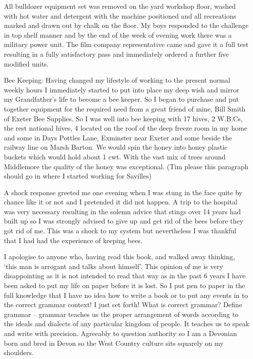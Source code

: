 All bulldozer equipment set was removed on the yard workshop floor, washed with
hot water and detergent with the machine positioned and all recreations marked
and drawn out by chalk on the floor.  My boys responded to the challenge in top
shelf manner and by the end of the week of evening work there was a military
power unit.  The film company representative came and gave it a full test
resulting in a fully satisfactory pass and immediately ordered a further five
modified units.

Bee Keeping:  Having changed my lifestyle of working to the present normal
weekly hours I immediately started to put into place my deep wish and mirror my
Grandfather's life to become a bee keeper.  So I began to purchase and put
together equipment for the required need from a great friend of mine, Bill
Smith of Exeter Bee Supplies.  So I was well into bee keeping with 17 hives, 2
W.B.Cs, the rest national hives, 4 located on the roof of the deep freeze room
in my home and some in Days Pottles Lane, Exminster near Exeter and some beside
the railway line on Marsh Barton.  We would spin the honey into honey plastic
buckets which would hold about 1 cwt.  With the vast mix of trees around
Middlemore the quality of the honey was exceptional.  (Tim please this
paragraph should go in where I started working for Savilles)

A shock response greeted me one evening when I was stung in the face quite by
chance like it or not and I pretended it did not happen.  A trip to the
hospital was very necessary resulting in the solemn advice that stings over 14
years had built up so I was strongly advised to give up and get rid of the bees
before they got rid of me.  This was a shock to my system but nevertheless I
was thankful that I had had the experience of keeping bees.

I apologise to anyone who, having read this book, and walked away
thinking, ‘this man is arrogant and talks about himself'.  This opinion of me
is very disappointing as it is not intended to read that way as in the past 6
years I have been asked to put my life on paper before it is lost.  So I put
pen to paper in the full knowledge that I have no idea how to write a book or
to put any events in to the correct grammar context!  I just set forth!  What
is correct grammar?  Define grammar – grammar teaches us the proper arrangement
of words according to the ideals and dialects of any particular kingdom of
people.  It teaches us to speak and write with precision.  Agreeably to
question authority so I am a Devonian born and bred in Devon so the West
Country culture sits squarely on my shoulders.

